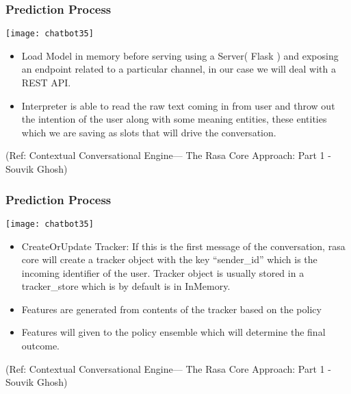  \begin{frame}[fragile]\frametitle{Prediction Process}
 

\begin{center}
\texttt{[image: chatbot35]}

\end{center}

\begin{itemize}
\item Load Model in memory before serving using a Server( Flask ) and exposing an endpoint related to a particular channel, in our case we will deal with a REST API.
\item Interpreter is able to read the raw text coming in from user and throw out the intention of the user along with some meaning entities, these entities which we are saving as slots that will drive the conversation.
\end{itemize}


\tiny{(Ref: Contextual Conversational Engine— The Rasa Core Approach: Part 1 - Souvik Ghosh)}

\end{frame}

 \begin{frame}[fragile]\frametitle{Prediction Process}
 

\begin{center}
\texttt{[image: chatbot35]}

\end{center}

\begin{itemize}
\item CreateOrUpdate Tracker: If this is the first message of the conversation, rasa core will create a tracker object with the key ``sender\_id'' which is the incoming identifier of the user. Tracker object is usually stored in a tracker\_store which is by default is in InMemory.
\item Features are generated from contents of the tracker based on the policy 
\item Features will given to the policy ensemble which will determine the final outcome.
\end{itemize}


\tiny{(Ref: Contextual Conversational Engine— The Rasa Core Approach: Part 1 - Souvik Ghosh)}

\end{frame}

